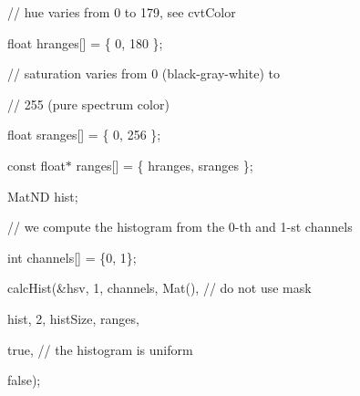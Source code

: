 {\ttfamily // hue varies from 0 to 179, see cvt\+Color}

{\ttfamily }

{\ttfamily }

{\ttfamily float hranges\mbox{[}\mbox{]} = \{ 0, 180 \};}

{\ttfamily }

{\ttfamily }

{\ttfamily // saturation varies from 0 (black-\/gray-\/white) to}

{\ttfamily }

{\ttfamily }

{\ttfamily // 255 (pure spectrum color)}

{\ttfamily }

{\ttfamily }

{\ttfamily float sranges\mbox{[}\mbox{]} = \{ 0, 256 \};}

{\ttfamily }

{\ttfamily }

{\ttfamily const float$\ast$ ranges\mbox{[}\mbox{]} = \{ hranges, sranges \};}

{\ttfamily }

{\ttfamily }

{\ttfamily Mat\+ND hist;}

{\ttfamily }

{\ttfamily }

{\ttfamily // we compute the histogram from the 0-\/th and 1-\/st channels}

{\ttfamily }

{\ttfamily }

{\ttfamily int channels\mbox{[}\mbox{]} = \{0, 1\};}

{\ttfamily }

{\ttfamily }

{\ttfamily calc\+Hist(\&hsv, 1, channels, Mat(), // do not use mask}

{\ttfamily }

{\ttfamily }

{\ttfamily hist, 2, hist\+Size, ranges,}

{\ttfamily }

{\ttfamily }

{\ttfamily true, // the histogram is uniform}

{\ttfamily }

{\ttfamily }

{\ttfamily false);}

{\ttfamily }

{\ttfamily }

